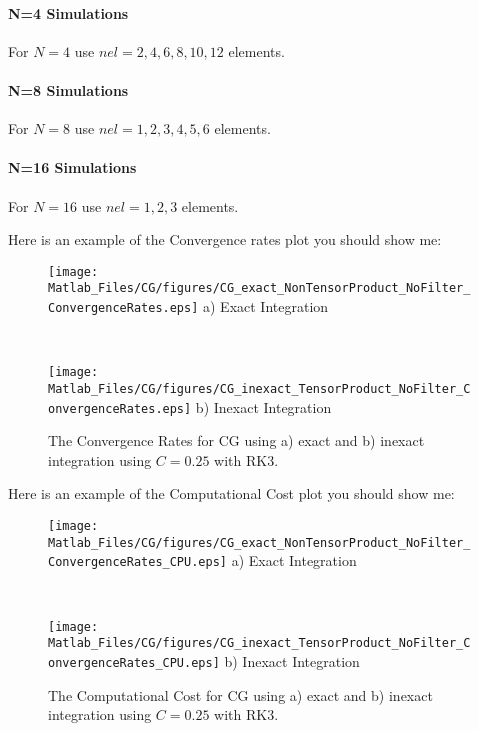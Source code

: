 \documentclass[10pt]{article}
\begin{document}
\paragraph{N=4 Simulations}
For $N=4$ use $nel=2, 4, 6, 8, 10, 12$ elements.

\paragraph{N=8 Simulations}
For $N=8$ use $nel=1, 2, 3, 4, 5, 6$ elements.

\paragraph{N=16 Simulations}
For $N=16$ use $nel=1,2,3$ elements.

Here is an example of the Convergence rates plot you should show me:
\begin{figure}[h]
\begin{center}
\begin{minipage}{2.20in}
\texttt{[image: Matlab\_Files/CG/figures/CG\_exact\_NonTensorProduct\_NoFilter\_ConvergenceRates.eps]}
a) Exact Integration 
\end{minipage} \ \hspace{0.125in} \
\begin{minipage}{2.20in}
\texttt{[image: Matlab\_Files/CG/figures/CG\_inexact\_TensorProduct\_NoFilter\_ConvergenceRates.eps]}
b) Inexact Integration
\end{minipage} 
\caption{The Convergence Rates for CG using a) exact and b) inexact integration using $C=0.25$ with RK3.}
\end{center}
\end{figure}

Here is an example of the Computational Cost plot you should show me:
\begin{figure}[h]
\begin{center}
\begin{minipage}{2.20in}
\texttt{[image: Matlab\_Files/CG/figures/CG\_exact\_NonTensorProduct\_NoFilter\_ConvergenceRates\_CPU.eps]}
a) Exact Integration 
\end{minipage} \ \hspace{0.125in} \
\begin{minipage}{2.20in}
\texttt{[image: Matlab\_Files/CG/figures/CG\_inexact\_TensorProduct\_NoFilter\_ConvergenceRates\_CPU.eps]}
b) Inexact Integration
\end{minipage} 
\caption{The Computational Cost for CG using a) exact and b) inexact integration using $C=0.25$ with RK3.}
\end{center}
\end{figure}
\end{document}
